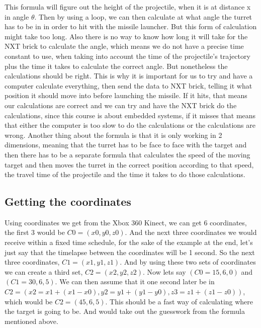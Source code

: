 This formula will figure out the height of the projectile, when it is at distance x in angle $\theta$. Then by using a loop, we can then calculate at what angle the turret has to be in in order to hit with the missile launcher. But this form of calculation might take too long. Also there is no way to know how long it will take for the NXT brick to calculate the angle, which means we do not have a precise time constant to use, when taking into account the time of the projectile's trajectory plus the time it takes to calculate the correct angle. But nonetheless the calculations should be right. This is why it is important for us to try and have a computer calculate everything, then send the data to NXT brick, telling it what position it should move into before launching the missile. If it hits, that means our calculations are correct and we can try and have the NXT brick do the calculations, since this course is about embedded systems, if it misses that means that either the computer is too slow to do the calculations or the calculations are wrong. Another thing about the formula is that it is only working in 2 dimensions, meaning that the turret has to be face to face with the target and then there has to be a separate formula that calculates the speed of the moving target and then moves the turret in the correct position according to that speed, the travel time of the projectile and the time it takes to do those calculations.

\subsection*{Getting the coordinates}
Using coordinates we get from the Xbox 360 Kinect, we can get 6 coordinates, the first 3 would be \begin{math}C0=(x0, y0, z0)\end{math}. And the next three coordinates we would receive within a fixed time schedule, for the sake of the example at the end, let's just say that the timelapse between the coordinates will be 1 second. So the next three coordinates, \begin{math}C1=(x1, y1, z1)\end{math}. And by using these two sets of coordinates we can create a third set, \begin{math}C2=(x2, y2, z2)\end{math}. Now lets say \begin{math}(C0=15, 6, 0)\end{math} and \begin{math}(C1=30, 6, 5)\end{math}. We can then assume that it one second later be in \begin{math}C2=(x2=x1+(x1-x0), y2=y1+(y1-y0), z3=z1+(z1-z0))\end{math}, which would be \begin{math}C2=(45, 6, 5)\end{math}. This should be a fast way of calculating where the target is going to be. And would take out the guesswork from the formula mentioned above.


